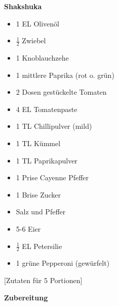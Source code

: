 
\parindent0pt	

\pagestyle{empty}


\textbf{{\LARGE Shakshuka}}%


\hrulefill

\vspace*{\fill}
\begin{multicols}{2}	


\begin{itemize}
\item 1 EL Olivenöl
\item $\frac{1}{2}$ Zwiebel
\item 1 Knoblauchzehe
\item 1 mittlere Paprika (rot o. grün)
\item 2 Dosen gestückelte Tomaten
\item 4 EL Tomatenpaste
\item 1 TL Chillipulver (mild)
\item 1 TL Kümmel
\item 1 TL Paprikapulver			%
\item 1 Prise Cayenne Pfeffer
\item 1 Brise Zucker
\item Salz und Pfeffer
\item 5-6 Eier
\item $\frac{1}{2}$ EL Petersilie
\item 1 grüne Pepperoni (gewürfelt)
\end{itemize}
\end{multicols}

\vspace{1cm}			%
\begin{center}			%
[Zutaten für 5 Portionen]%
\end{center}


\vfill
\newpage
\textbf{{\LARGE Zubereitung}}%

\hrulefill

